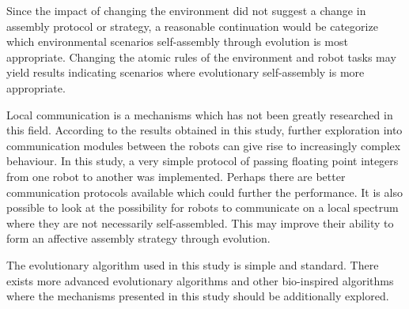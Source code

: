 Since the impact of changing the environment did not suggest a change in assembly protocol or strategy, a reasonable continuation would be categorize which environmental scenarios self-assembly through evolution is most appropriate. 
Changing the atomic rules of the environment and robot tasks may yield results indicating scenarios where evolutionary self-assembly is more appropriate.

Local communication is a mechanisms which has not been greatly researched in this field. 
According to the results obtained in this study, further exploration into communication modules between the robots can give rise to increasingly complex behaviour.
In this study, a very simple protocol of passing floating point integers from one robot to another was implemented.
Perhaps there are better communication protocols available which could further the performance.
It is also possible to look at the possibility for robots to communicate on a local spectrum where they are not necessarily self-assembled.
This may improve their ability to form an affective assembly strategy through evolution.

The evolutionary algorithm used in this study is simple and standard.
There exists more advanced evolutionary algorithms and other bio-inspired algorithms where the mechanisms presented in this study should be additionally explored.
